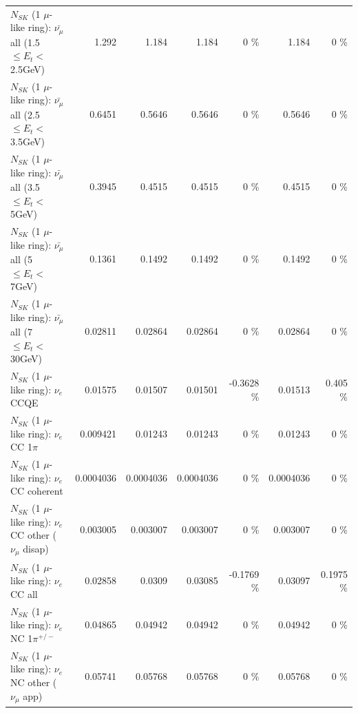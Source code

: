 \begin{table}
\begin{tabular}{| l | r | r | r  r | r  r |}
 $N_{SK}$ (1 $\mu$-like ring): $\bar{\nu_{\mu}}$ all (1.5 $\leq E_{t} <$ 2.5GeV) &           1.292 &           1.184 &           1.184 &        0 \%  &           1.184 &        0 \%  \\ 
 $N_{SK}$ (1 $\mu$-like ring): $\bar{\nu_{\mu}}$ all (2.5 $\leq E_{t} <$ 3.5GeV) &          0.6451 &          0.5646 &          0.5646 &        0 \%  &          0.5646 &        0 \%  \\ 
   $N_{SK}$ (1 $\mu$-like ring): $\bar{\nu_{\mu}}$ all (3.5 $\leq E_{t} <$ 5GeV) &          0.3945 &          0.4515 &          0.4515 &        0 \%  &          0.4515 &        0 \%  \\ 
     $N_{SK}$ (1 $\mu$-like ring): $\bar{\nu_{\mu}}$ all (5 $\leq E_{t} <$ 7GeV) &          0.1361 &          0.1492 &          0.1492 &        0 \%  &          0.1492 &        0 \%  \\ 
    $N_{SK}$ (1 $\mu$-like ring): $\bar{\nu_{\mu}}$ all (7 $\leq E_{t} <$ 30GeV) &         0.02811 &         0.02864 &         0.02864 &        0 \%  &         0.02864 &        0 \%  \\ 
\hline
\hline
\hline
                                      $N_{SK}$ (1 $\mu$-like ring): $\nu_e$ CCQE &         0.01575 &         0.01507 &         0.01501 &  -0.3628 \%  &         0.01513 &    0.405 \%  \\ 
                                 $N_{SK}$ (1 $\mu$-like ring): $\nu_e$ CC 1$\pi$ &        0.009421 &         0.01243 &         0.01243 &        0 \%  &         0.01243 &        0 \%  \\ 
                               $N_{SK}$ (1 $\mu$-like ring): $\nu_e$ CC coherent &       0.0004036 &       0.0004036 &       0.0004036 &        0 \%  &       0.0004036 &        0 \%  \\ 
                $N_{SK}$ (1 $\mu$-like ring): $\nu_e$ CC other ($\nu_\mu$ disap) &        0.003005 &        0.003007 &        0.003007 &        0 \%  &        0.003007 &        0 \%  \\ 
                                  $N_{SK}$ (1 $\mu$-like ring): $\nu_{e}$ CC all &         0.02858 &          0.0309 &         0.03085 &  -0.1769 \%  &         0.03097 &   0.1975 \%  \\ 
\hline
                           $N_{SK}$ (1 $\mu$-like ring): $\nu_e$ NC 1$\pi^{+/-}$ &         0.04865 &         0.04942 &         0.04942 &        0 \%  &         0.04942 &        0 \%  \\ 
                  $N_{SK}$ (1 $\mu$-like ring): $\nu_e$ NC other ($\nu_\mu$ app) &         0.05741 &         0.05768 &         0.05768 &        0 \%  &         0.05768 &        0 \%  \\ 

\end{tabular}
\end{table}
